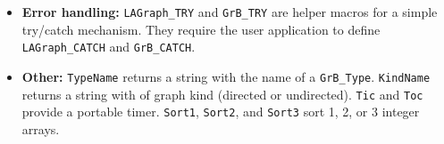 \begin{itemize}
\item {\bf Error handling:}
    \verb'LAGraph_TRY' and \verb'GrB_TRY' are helper macros for a simple try/catch
    mechanism.  They require the user application to define \verb'LAGraph_CATCH'
    and \verb'GrB_CATCH'.

\item {\bf Other:}
    \verb'TypeName' returns a string with the name of a \verb'GrB_Type'.
    \verb'KindName' returns a string with of graph kind (directed or undirected).
    \verb'Tic' and \verb'Toc' provide a portable timer.
    \verb'Sort1', \verb'Sort2', and \verb'Sort3' sort 1, 2, or 3 integer arrays.






\end{itemize}

